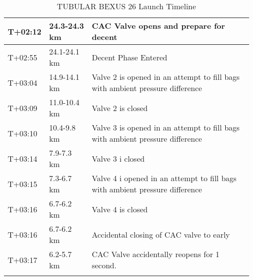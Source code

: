 \begin{longtable}{|m{}|m{}|m{}|}
        T+02:12 & 24.3-24.3 km & CAC Valve opens and prepare for decent\\ \hline
        T+02:55 & 24.1-24.1 km& Decent Phase Entered\\ \hline
        T+03:04 & 14.9-14.1 km & Valve 2 is opened in an attempt to fill bags with ambient pressure difference \\ \hline
        T+03:09 & 11.0-10.4 km & Valve 2 is closed \\ \hline
        T+03:10 & 10.4-9.8 km & Valve 3 is opened in an attempt to fill bags with ambient pressure difference \\ \hline
        T+03:14 & 7.9-7.3 km & Valve 3 i closed \\ \hline
        T+03:15 & 7.3-6.7 km & Valve 4 i opened in an attempt to fill bags with ambient pressure difference \\ \hline
        T+03:16 & 6.7-6.2 km & Valve 4 is closed \\ \hline
        T+03:16 & 6.7-6.2 km & Accidental closing of CAC valve to early \\ \hline
        T+03:17 & 6.2-5.7 km & CAC Valve accidentally reopens for 1 second. \\ \hline
    \caption{TUBULAR BEXUS 26 Launch Timeline}
    \label{tab:LaunchTimelineActuall}
\end{longtable}
    